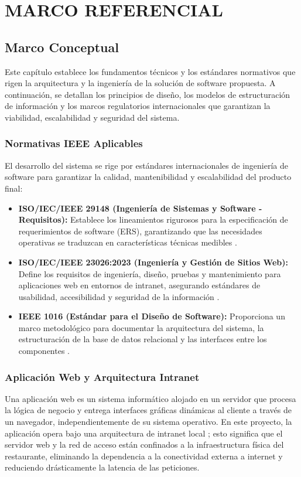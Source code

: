\chapter{MARCO REFERENCIAL}

\section{Marco Conceptual}

Este capítulo establece los fundamentos técnicos y los estándares normativos que rigen la arquitectura y la ingeniería de la solución de software propuesta. A continuación, se detallan los principios de diseño, los modelos de estructuración de información y los marcos regulatorios internacionales que garantizan la viabilidad, escalabilidad y seguridad del sistema.

\subsection{Normativas IEEE Aplicables}
El desarrollo del sistema se rige por estándares internacionales de ingeniería de software para garantizar la calidad, mantenibilidad y escalabilidad del producto final:
\begin{itemize}
	\item \textbf{ISO/IEC/IEEE 29148 (Ingeniería de Sistemas y Software - Requisitos):} Establece los lineamientos rigurosos para la especificación de requerimientos de software (ERS), garantizando que las necesidades operativas se traduzcan en características técnicas medibles \cite{BALSAM2025112186}.
	\item \textbf{ISO/IEC/IEEE 23026:2023 (Ingeniería y Gestión de Sitios Web):} Define los requisitos de ingeniería, diseño, pruebas y mantenimiento para aplicaciones web en entornos de intranet, asegurando estándares de usabilidad, accesibilidad y seguridad de la información \cite{IEEE23026}.
	\item \textbf{IEEE 1016 (Estándar para el Diseño de Software):} Proporciona un marco metodológico para documentar la arquitectura del sistema, la estructuración de la base de datos relacional y las interfaces entre los componentes \cite{IEEE1016}.
\end{itemize}

\subsection{Aplicación Web y Arquitectura Intranet}
Una aplicación web es un sistema informático alojado en un servidor que procesa la lógica de negocio y entrega interfaces gráficas dinámicas al cliente a través de un navegador, independientemente de su sistema operativo. En este proyecto, la aplicación opera bajo una arquitectura de intranet local \cite{akyildiz2006survey}; esto significa que el servidor web y la red de acceso están confinados a la infraestructura física del restaurante, eliminando la dependencia a la conectividad externa a internet y reduciendo drásticamente la latencia de las peticiones.


